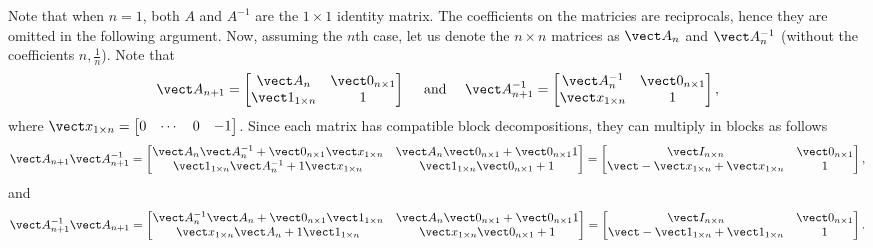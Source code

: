 \documentclass{homework}
\begin{document}
\begin{longproblem}
  \begin{solution}
  Note that when $n=1$, both $A$ and $A^{-1}$ are the $1\times1$ identity matrix.  The coefficients on the matricies are reciprocals, hence they are omitted in the following argument.  Now, assuming the $n$th case, let us denote the $n\times n$ matrices as $\vect A_n$ and $\vect A^{-1}_n$ (without the coefficients $n,\frac 1n$).  Note that 
  $$
  \vect A_{n+1} = \begin{bmatrix}
  \vect A_n & \vect 0_{n\times 1} \\
  \vect 1_{1\times n} & 1
  \end{bmatrix}
  \quad\text{ and }
  \quad
  \vect A_{n+1}^{-1} = \begin{bmatrix}
  \vect A_n^{-1} & \vect 0_{n\times 1}\\
  \vect x_{1\times n} & 1
  \end{bmatrix},
  $$ 
  where $\vect x_{1\times n} = \begin{bmatrix}0&\cdots&0&-1\end{bmatrix}$.  Since each matrix has compatible block decompositions, they can multiply in blocks as follows
  $$
  \vect A_{n+1} \vect A_{n+1}^{-1} = \begin{bmatrix}
  \vect A_n \vect A_n^{-1} + \vect 0_{n\times 1} \vect x_{1\times n} & \vect A_n \vect 0_{n\times 1} + \vect 0_{n\times 1} 1 \\
  \vect 1_{1\times n} \vect A_n^{-1} + 1\vect x_{1\times n} & \vect 1_{1\times n} \vect 0_{n\times 1} + 1
  \end{bmatrix}
  =\begin{bmatrix}
  \vect I_{n\times n} & \vect 0_{n\times 1}\\
  \vect -\vect x_{1\times n} + \vect x_{1\times n} & 1
  \end{bmatrix},
  $$
  and
  $$
    \vect A_{n+1}^{-1} \vect A_{n+1} = \begin{bmatrix}
  \vect A_n^{-1}\vect A_n  + \vect 0_{n\times 1} \vect 1_{1\times n} & \vect A_n \vect 0_{n\times 1} + \vect 0_{n\times 1} 1 \\
  \vect x_{1\times n}\vect A_n + 1\vect 1_{1\times n} & \vect x_{1\times n}\vect 0_{n\times 1} + 1
  \end{bmatrix}
  =\begin{bmatrix}
  \vect I_{n\times n} & \vect 0_{n\times 1}\\
  \vect -\vect 1_{1\times n} + \vect 1_{1\times n} & 1
    \end{bmatrix}.
  $$
  \end{solution}


\end{longproblem}
\end{document}
